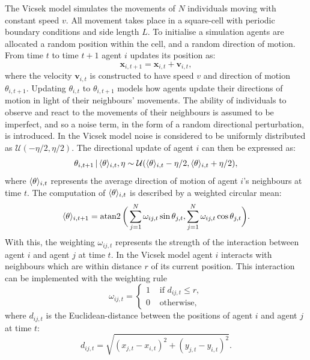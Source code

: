 The Vicsek model simulates the movements of $N$ individuals moving with constant speed
$v$. All movement takes place in a square-cell with periodic boundary conditions and side
length $L$. To initialise a simulation agents are allocated a random position within
the cell, and a random direction of motion. From time $t$ to time $t+1$ agent $i$ updates
its position as:
\begin{equation*}
    \bm{x}_{i, t+1} = \bm{x}_{i, t} + \bm{v}_{i, t},
\end{equation*}
where the velocity $\bm{v}_{i,t}$ is constructed to have speed $v$ and direction of motion
$\theta_{i, t+1}$. Updating $\theta_{i,t}$ to $\theta_{i, t+1}$ models how agents update
their directions of motion in light of their neighbours' movements. The ability of
individuals to observe and react to the movements of their neighbours is assumed to be
imperfect, and so a noise term, in the form of a random directional perturbation, is
introduced. In the Vicsek model noise is considered to be uniformly distributed as
$\mathcal{U}(-\eta/2, \eta/2)$. The directional update of agent $i$ can then be expressed
as:
\begin{equation}
    \label{eq:vicsek_update}
    \theta_{i, t+1} \,|\, \langle\theta\rangle_{i, t}, \eta \sim
                     \mathcal{U}(\langle\theta\rangle_{i, t} - \eta/2,
                                 \langle\theta\rangle_{i, t} + \eta/2),
\end{equation}
where $\langle\theta\rangle_{i, t}$ represents the average direction of motion of agent $i$'s
neighbours at time $t$. The computation of $\langle\theta\rangle_{i, t}$ is described by a
weighted circular mean:
\begin{equation}
    \langle\theta\rangle_{i, t+1} = \operatorname{atan2}\bigg(
        \sum_{j=1}^N \omega_{ij, t} \sin\theta_{j,t},
        \sum_{j=1}^N \omega_{ij, t} \cos\theta_{j,t}
    \bigg).
\end{equation}
With this, the weighting $\omega_{ij, t}$ represents the strength of the interaction
between agent $i$ and agent $j$ at time $t$. In the Vicsek model agent $i$ interacts
with neighbours which are within distance $r$ of its current position. This interaction
can be implemented with the weighting rule
\begin{equation}
    \label{eq:vicsek_interaction}
    \omega_{ij,t} =
    \begin{cases}
        1 & \text{ if } d_{ij, t} \leq r,\\
        0 & \text{ otherwise,}
    \end{cases}
\end{equation}
where $d_{ij,t}$ is the Euclidean-distance between the positions of agent $i$ and agent
$j$ at time $t$:
\begin{equation*}
    d_{ij,t} = \sqrt{(x_{j,t} - x_{i,t})^2 + (y_{j,t} - y_{i,t})^2}.
\end{equation*}


